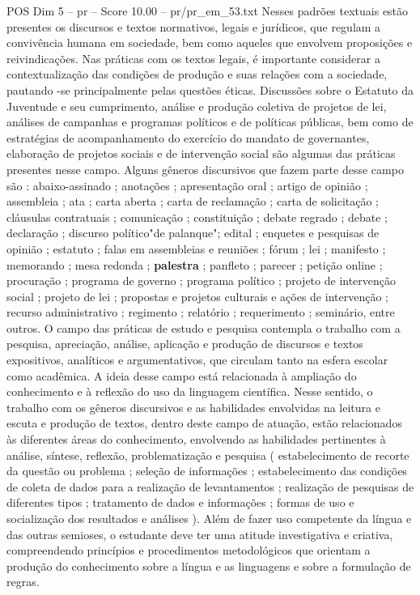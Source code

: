 \begin{textsample}{POS Dim 5 – pr – Score 10.00 – pr/pr\_em\_53.txt}
Nesses padrões textuais estão presentes os discursos e textos normativos, legais e jurídicos, que regulam a convivência humana em sociedade, bem como aqueles que envolvem proposições e reivindicações.
Nas práticas com os textos legais, é importante considerar a contextualização das condições de produção e suas relações com a sociedade, pautando -se principalmente pelas questões éticas.
Discussões sobre o Estatuto da Juventude e seu cumprimento, análise e produção coletiva de projetos de lei, análises de campanhas e programas políticos e de políticas públicas, bem como de estratégias de acompanhamento do exercício do mandato de governantes, elaboração de projetos sociais e de intervenção social são algumas das práticas presentes nesse campo.
Alguns gêneros discursivos que fazem parte desse campo são : abaixo-assinado ; anotações ; apresentação oral ; artigo de opinião ; assembleia ; ata ; carta aberta ; carta de reclamação ; carta de solicitação ; cláusulas contratuais ; comunicação ; constituição ; debate regrado ; debate ; declaração ; discurso político"de palanque"; edital ; enquetes e pesquisas de opinião ; estatuto ; falas em assembleias e reuniões ; fórum ; lei ; manifesto ; memorando ; mesa redonda ; \textbf{palestra} ; panfleto ; parecer ; petição online ; procuração ; programa de governo ; programa político ; projeto de intervenção social ; projeto de lei ; propostas e projetos culturais e ações de intervenção ; recurso administrativo ; regimento ; relatório ; requerimento ; seminário, entre outros.
O campo das práticas de estudo e pesquisa contempla o trabalho com a pesquisa, apreciação, análise, aplicação e produção de discursos e textos expositivos, analíticos e argumentativos, que circulam tanto na esfera escolar como acadêmica.
A ideia desse campo está relacionada à ampliação do conhecimento e à reflexão do uso da linguagem científica.
Nesse sentido, o trabalho com os gêneros discursivos e as habilidades envolvidas na leitura e escuta e produção de textos, dentro deste campo de atuação, estão relacionados às diferentes áreas do conhecimento, envolvendo as habilidades pertinentes à análise, síntese, reflexão, problematização e pesquisa ( estabelecimento de recorte da questão ou problema ; seleção de informações ; estabelecimento das condições de coleta de dados para a realização de levantamentos ; realização de pesquisas de diferentes tipos ; tratamento de dados e informações ; formas de uso e socialização dos resultados e análises ).
Além de fazer uso competente da língua e das outras semioses, o estudante deve ter uma atitude investigativa e criativa, compreendendo princípios e procedimentos metodológicos que orientam a produção do conhecimento sobre a língua e as linguagens e sobre a formulação de regras.

\end{textsample}
